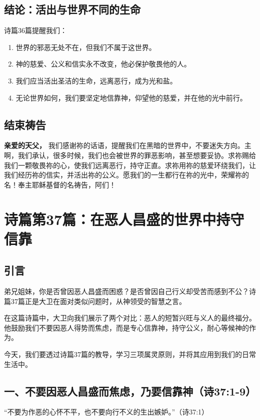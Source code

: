 \documentclass[a4paper, 12pt]{article}
\begin{document}
\subsection*{结论：活出与世界不同的生命}
诗篇36篇提醒我们：
\begin{enumerate}
    \item 世界的邪恶无处不在，但我们不属于这世界。

    \item 神的慈爱、公义和信实永不改变，他必保护敬畏他的人。

    \item 我们应当活出圣洁的生命，远离恶行，成为光和盐。

    \item 无论世界如何，我们要坚定地信靠神，仰望他的慈爱，并在他的光中前行。

\end{enumerate}

\subsection*{结束祷告}
\textbf{亲爱的天父，}
我们感谢祢的话语，提醒我们在黑暗的世界中，不要迷失方向。主啊，我们承认，很多时候，我们也会被世界的罪恶影响，甚至想要妥协。求祢赐给我们一颗敬畏祢的心，使我们远离恶行，持守正直。求祢用祢的慈爱环绕我们，让我们经历祢的信实，并活出祢的公义。愿我们的一生都行在祢的光中，荣耀祢的名！奉主耶稣基督的名祷告，阿们！
\newpage
\section{诗篇第37篇：在恶人昌盛的世界中持守信靠}
\subsection*{引言}
\hspace{0.6cm}弟兄姐妹，你是否曾因恶人昌盛而困惑？是否曾因自己行义却受苦而感到不公？诗篇37篇正是大卫在面对类似问题时，从神领受的智慧之言。

在这篇诗篇中，大卫向我们展示了两个对比：恶人的短暂兴旺与义人的最终福分。他鼓励我们不要因恶人得势而焦虑，而是专心信靠神，持守公义，耐心等候神的作为。

今天，我们要透过诗篇37篇的教导，学习三项属灵原则，并将其应用到我们的日常生活中。

\subsection*{一、不要因恶人昌盛而焦虑，乃要信靠神（诗37:1-9）}
“不要为作恶的心怀不平，也不要向行不义的生出嫉妒。”（诗37:1）
\end{document}
